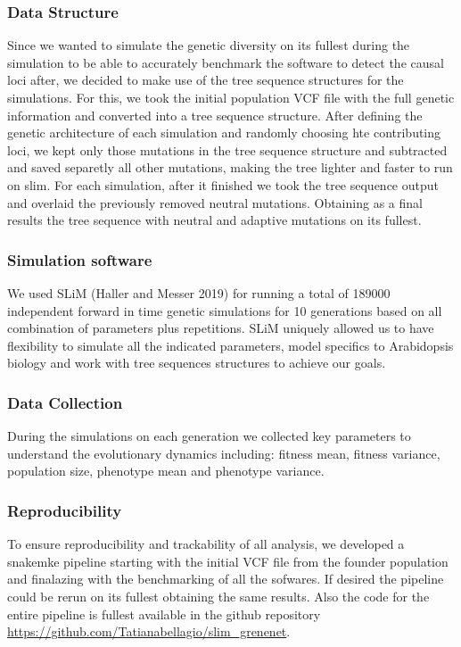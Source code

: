 \documentclass{article}
\begin{document}
\subsubsection{Data Structure}
Since we wanted to simulate the genetic diversity on its fullest during the simulation to be able to accurately benchmark the software to detect the causal loci after, we decided to make use of the tree sequence structures for the simulations. For this, we took the initial population VCF file with the full genetic information and converted into a tree sequence structure. After defining the genetic architecture of each simulation and randomly choosing hte contributing loci, we kept only those mutations in the tree sequence structure and subtracted and saved separetly all other mutations, making the tree lighter and faster to run on slim. For each simulation, after it finished we took the tree sequence output and overlaid the previously removed neutral mutations. Obtaining as a final results the tree sequence with neutral and adaptive mutations on its fullest. 

\subsubsection{Simulation software}
We used SLiM (Haller and Messer 2019) for running a total of 189000 independent forward in time genetic simulations for 10 generations based on all combination of parameters plus repetitions. SLiM uniquely allowed us to have flexibility to simulate all the indicated parameters, model specifics to Arabidopsis biology and work with tree sequences structures to achieve our goals. 

\subsubsection{Data Collection}
During the simulations on each generation we collected key parameters to understand the evolutionary dynamics including: fitness mean, fitness variance, population size, phenotype mean and phenotype variance. 

\subsubsection{Reproducibility}
To ensure reproducibility and trackability of all analysis, we developed a snakemke pipeline starting with the initial VCF file from the founder population and finalazing with the benchmarking of all the sofwares. If desired the pipeline could be rerun on its fullest obtaining the same results. Also the code for the entire pipeline is fullest available in the github repository \url{https://github.com/Tatianabellagio/slim_grenenet}.
\end{document}
